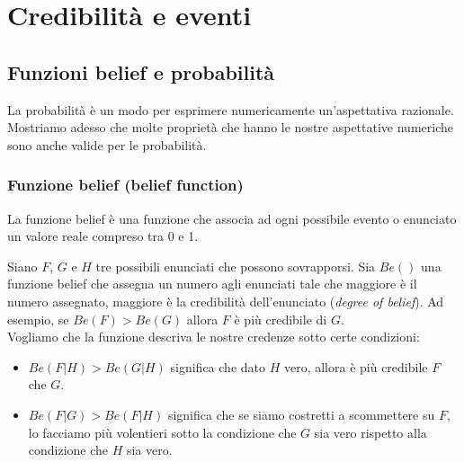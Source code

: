 \documentclass[../main.tex]{subfiles}
\begin{document}
\chapter{Credibilità e eventi}
\section{Funzioni belief e probabilità}
La probabilità è un modo per esprimere numericamente un'aspettativa razionale.
Mostriamo adesso che molte proprietà che hanno le nostre aspettative numeriche sono anche valide per le probabilità.
\subsection{Funzione belief (belief function)}
\begin{definition}
    \label{def:funzione_belief}
    La funzione belief è una funzione che associa ad ogni possibile evento o enunciato un valore reale compreso tra 0 e 1.
\end{definition}
\hfill \break
Siano $F$, $G$ e $H$ tre possibili enunciati che possono sovrapporsi.
Sia $Be()$ una funzione belief che assegna un numero agli enunciati tale che maggiore è il numero assegnato, maggiore è la credibilità dell'enunciato (\textit{degree of belief}).
Ad esempio, se $Be(F) > Be(G)$ allora $F$ è più credibile di $G$.\\
Vogliamo che la funzione descriva le nostre credenze sotto certe condizioni:
\begin{itemize}
    \item $Be(F|H) > Be(G|H)$ significa che dato $H$ vero, allora è più credibile $F$ che $G$.
    \item $Be(F|G) > Be(F|H)$ significa che se siamo costretti a scommettere su $F$, lo facciamo più volentieri sotto la condizione che $G$ sia vero rispetto alla condizione che $H$ sia vero.
\end{itemize}
\end{document}
